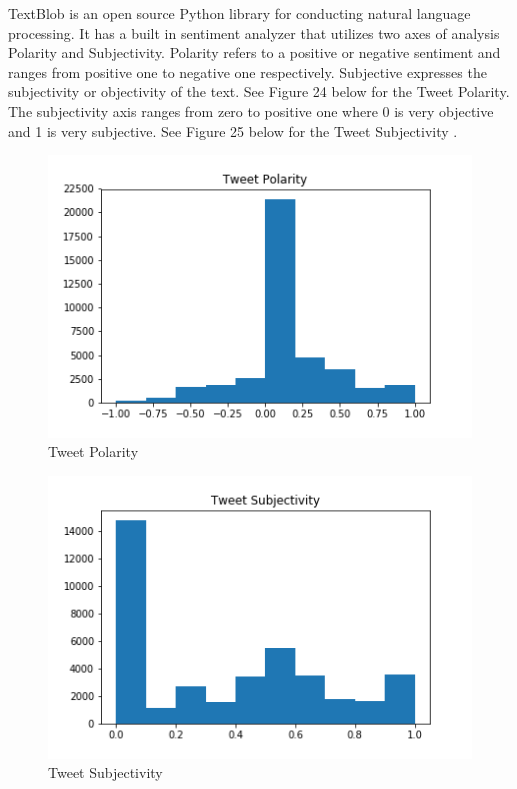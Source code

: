 \documentclass[12pt,oneside]{chicagocapstone}
\begin{document}
TextBlob is an open source Python library for conducting natural
language processing. It has a built in sentiment analyzer that utilizes
two axes of analysis Polarity and Subjectivity. Polarity refers to a
positive or negative sentiment and ranges from positive one to negative
one respectively. Subjective expresses the subjectivity or objectivity
of the text. See Figure 24 below for the Tweet Polarity. The
subjectivity axis ranges from zero to positive one where 0 is very
objective and 1 is very subjective. See Figure 25 below for the Tweet
Subjectivity .
\begin{figure}
\centering
\includegraphics{./figure/Tweet_Polarity.png}
\caption{Tweet Polarity}
\end{figure}
\begin{figure}
\centering
\includegraphics{./figure/Tweet_Subjectivity.png}
\caption{Tweet Subjectivity}
\end{figure}
\end{document}

